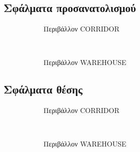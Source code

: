 \subsection{Σφάλματα προσανατολισμού}

\begin{figure}[h]
  \begin{subfigure}{\linewidth}
  \hspace{-1.25cm}
    
    \vspace{0.3cm}
    \caption{Περιβάλλον CORRIDOR}
    \label{}
  \end{subfigure}\\
  \begin{subfigure}{\linewidth}\vspace{0.5cm}
    \hspace{-1.25cm}
    
    \vspace{0.3cm}
    \caption{Περιβάλλον WAREHOUSE}
    \label{}
    \end{subfigure}
\caption{}
\label{}
\end{figure}

\subsection{Σφάλματα θέσης}

\begin{figure}[h]
  \begin{subfigure}{\linewidth}
  \hspace{-1.25cm}
    
    \vspace{0.3cm}
    \caption{Περιβάλλον CORRIDOR}
    \label{}
  \end{subfigure}\\
  \begin{subfigure}{\linewidth}\vspace{0.5cm}
    \hspace{-1.25cm}
    
    \vspace{0.3cm}
    \caption{Περιβάλλον WAREHOUSE}
    \label{}
    \end{subfigure}
\caption{}
\label{}
\end{figure}
